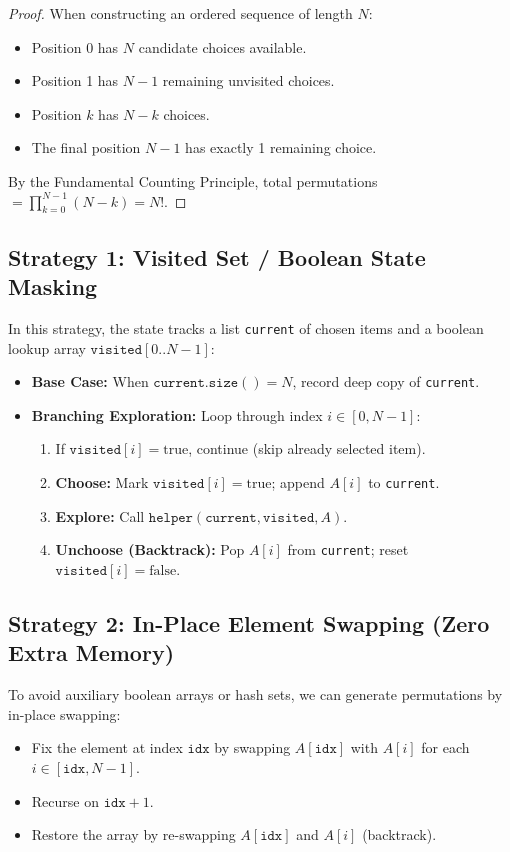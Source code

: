\documentclass[10pt,journal,compsoc,onecolumn]{IEEEtran}
\begin{document}
\begin{proof}
When constructing an ordered sequence of length $N$:
\begin{itemize}
    \item Position 0 has $N$ candidate choices available.
    \item Position 1 has $N-1$ remaining unvisited choices.
    \item Position $k$ has $N-k$ choices.
    \item The final position $N-1$ has exactly 1 remaining choice.
\end{itemize}
By the Fundamental Counting Principle, total permutations $= \prod_{k=0}^{N-1} (N-k) = N!$.
\end{proof}

\subsection{Strategy 1: Visited Set / Boolean State Masking}
In this strategy, the state tracks a list \texttt{current} of chosen items and a boolean lookup array $\texttt{visited}[0..N-1]$:
\begin{itemize}
    \item \textbf{Base Case:} When $\texttt{current.size}() = N$, record deep copy of \texttt{current}.
    \item \textbf{Branching Exploration:} Loop through index $i \in [0, N-1]$:
    \begin{enumerate}
        \item If $\texttt{visited}[i] = \text{true}$, continue (skip already selected item).
        \item \textbf{Choose:} Mark $\texttt{visited}[i] = \text{true}$; append $A[i]$ to \texttt{current}.
        \item \textbf{Explore:} Call $\texttt{helper}(\texttt{current}, \texttt{visited}, A)$.
        \item \textbf{Unchoose (Backtrack):} Pop $A[i]$ from \texttt{current}; reset $\texttt{visited}[i] = \text{false}$.
    \end{enumerate}
\end{itemize}

\subsection{Strategy 2: In-Place Element Swapping (Zero Extra Memory)}
To avoid auxiliary boolean arrays or hash sets, we can generate permutations by in-place swapping:
\begin{itemize}
    \item Fix the element at index $\texttt{idx}$ by swapping $A[\texttt{idx}]$ with $A[i]$ for each $i \in [\texttt{idx}, N-1]$.
    \item Recurse on $\texttt{idx} + 1$.
    \item Restore the array by re-swapping $A[\texttt{idx}]$ and $A[i]$ (backtrack).
\end{itemize}
\end{document}
